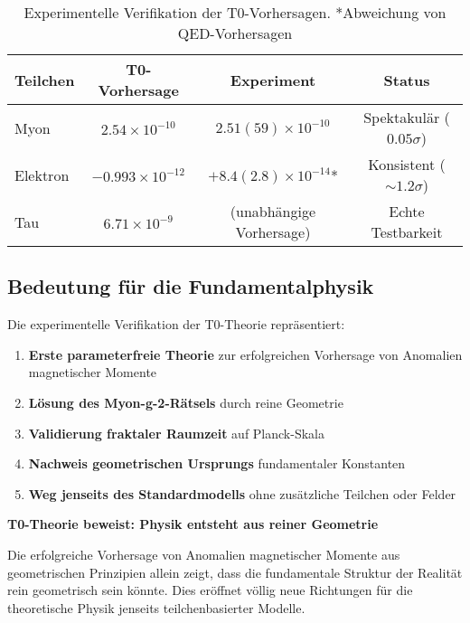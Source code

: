 \documentclass[12pt,a4paper]{article}
\numberwithin{equation}{section}
\begin{document}
	\begin{table}[h]
		\centering
		\begin{tabular}{lccc}
			\toprule
			\textbf{Teilchen} & \textbf{T0-Vorhersage} & \textbf{Experiment} & \textbf{Status} \\
			\midrule
			Myon & $2.54 \times 10^{-10}$ & $2.51(59) \times 10^{-10}$ & Spektakulär ($0.05\sigma$) \\
			Elektron & $-0.993 \times 10^{-12}$ & $+8.4(2.8) \times 10^{-14}$* & Konsistent ($\sim 1.2\sigma$) \\
			Tau & $6.71 \times 10^{-9}$ & (unabhängige Vorhersage) & Echte Testbarkeit \\
			\bottomrule
		\end{tabular}
		\caption{Experimentelle Verifikation der T0-Vorhersagen. *Abweichung von QED-Vorhersagen}
		\label{tab:experimental_verification}
	\end{table}
	
	\subsection{Bedeutung für die Fundamentalphysik}
	
	Die experimentelle Verifikation der T0-Theorie repräsentiert:
	
	\begin{enumerate}
		\item \textbf{Erste parameterfreie Theorie} zur erfolgreichen Vorhersage von Anomalien magnetischer Momente
		\item \textbf{Lösung des Myon-g-2-Rätsels} durch reine Geometrie
		\item \textbf{Validierung fraktaler Raumzeit} auf Planck-Skala
		\item \textbf{Nachweis geometrischen Ursprungs} fundamentaler Konstanten
		\item \textbf{Weg jenseits des Standardmodells} ohne zusätzliche Teilchen oder Felder
	\end{enumerate}
	
	\begin{tcolorbox}[title={\textbf{REVOLUTIONÄRE AUSWIRKUNG}},colframe=purple,colback=purple!5]
		\textbf{T0-Theorie beweist: Physik entsteht aus reiner Geometrie}
		
		Die erfolgreiche Vorhersage von Anomalien magnetischer Momente aus geometrischen Prinzipien allein zeigt, dass die fundamentale Struktur der Realität rein geometrisch sein könnte. Dies eröffnet völlig neue Richtungen für die theoretische Physik jenseits teilchenbasierter Modelle.
	\end{tcolorbox}
	
\end{document}
